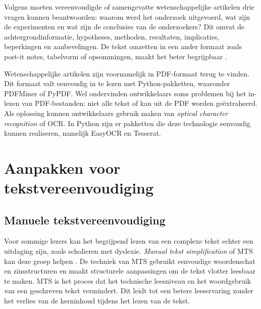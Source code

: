 \medspace

Volgens \textcite{Hollenkamp2020, McCombes2022} moeten vereenvoudigde of samengevatte wetenschappelijke artikelen drie vragen kunnen beantwoorden: waarom werd het onderzoek uitgevoerd, wat zijn de experimenten en wat zijn de conclusies van de onderzoekers? Dit omvat de achtergrondinformatie, hypotheses, methoden, resultaten, implicaties, beperkingen en aanbevelingen. De tekst omzetten in een ander formaat zoals post-it notes, tabelvorm of opsommingen, maakt het beter begrijpbaar \autocite{Rijkhoff2022}. 

\medspace

Wetenschappelijke artikelen zijn voornamelijk in PDF-formaat terug te vinden. Dit formaat valt eenvoudig in te lezen met Python-pakketten, waaronder PDFMiner of PyPDF. Wel ondervinden ontwikkelaars soms problemen bij het in- lezen van PDF-bestanden: niet alle tekst of kan uit de PDF worden geëxtraheerd. Als oplossing kunnen ontwikkelaars gebruik maken van \textit{optical character recognition} of OCR. In Python zijn er pakketten die deze technologie eenvoudig kunnen realiseren, namelijk EasyOCR en Tesserat.

\section{Aanpakken voor tekstvereenvoudiging}

\subsection{Manuele tekstvereenvoudiging}

Voor sommige lezers kan het begrijpend lezen van een complexe tekst echter een uitdaging zijn, zoals scholieren met dyslexie. \textit{Manual tekst simplification} of MTS kan deze groep helpen \autocite{Siddharthan2014}. De techniek van MTS gebruikt eenvoudige woordenschat en zinsstructuren en maakt structurele aanpassingen om de tekst vlotter leesbaar te maken. MTS is het proces dat het technische leesniveau en het woordgebruik van een geschreven tekst vermindert. Dit leidt tot een betere leeservaring zonder het verlies van de kerninhoud tijdens het lezen van de tekst.

